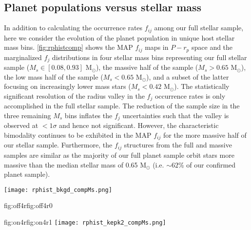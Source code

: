 \documentclass[twocolumn]{emulateapj}
\newcommand{\kepler}[1]{\emph{Kepler}#1}
\newcommand{\ktwo}[1]{\emph{K2}#1}
\newcommand{\cdbox}[1]{%
  \colorlet{currentcolor}{.}%
  {\color{Blue1}%
    \dbox{\color{currentcolor}#1}}%
}
\newcommand{\ToggleLayer}[2]{%
  \leavevmode
  \pdfstartlink user {
    /Subtype /Link
    /Border [0 0 0]%
    /A <<
      /S/JavaScript
      /JS (
         var aOCGs = this.getOCGs(), Layer;
         var Layers = "#1".split(","), Active = -1, i, l;
         for (l=0; l<Layers.length; l++) {
           Layer = Layers[l];
           for (i=0; aOCGs && i<aOCGs.length; i++) {
             if (aOCGs[i].state && aOCGs[i].name == Layer) {
               Active = l;
               aOCGs[i].state = false;
             }
           }
           if (Active >= 0) break;
         }
         if (Active == -1) {
           for (l=0; l<Layers.length; l++) {
             if (Layers[l] == "") Active = l;
           }
         }
         Active = Active + 1;
         if (Active == Layers.length) Active = 0;
         Layer = Layers[Active];
         for (i=0; aOCGs && i<aOCGs.length; i++) {
           if (aOCGs[i].name == Layer) aOCGs[i].state = true;
         }
      )
    >>
  }#2%
  \pdfendlink
}
\begin{document}
\subsection{Planet populations versus stellar mass} \label{sect:Msbin}
In addition to calculating the occurrence rates $f_{ij}$ among our full stellar sample, here we consider
the evolution of the planet population in unique host stellar mass bins. \autoref{fig:rphistcomp} shows
the MAP $f_{ij}$ maps in $P-r_p$ space and the marginalized $f_j$ distributions in four stellar mass bins
representing our full stellar sample
($M_s \in [0.08,0.93]$ M$_{\odot}$), the massive half of the sample ($M_s>0.65$ M$_{\odot}$),  
the low mass half of the sample ($M_s<0.65$ M$_{\odot}$), and a subset of the latter focusing on
increasingly lower mass stars ($M_s<0.42$ M$_{\odot}$). The statistically significant resolution of the
radius valley in the $f_j$ occurrence rates is only accomplished in the full stellar sample. The reduction
of the sample size in the three remaining $M_s$ bins inflates the $f_j$ uncertainties such that the valley
is observed at $<1\sigma$ and hence not significant. However, the characteristic bimodality continues to be
exhibited in the
MAP $f_{ij}$ for the more massive half of our stellar sample. Furthermore, the $f_{ij}$ structures from
the full and massive samples are similar
as the majority of our full planet sample orbit stars more massive than the median stellar mass of 0.65
M$_{\odot}$ (i.e. $\sim 62$\% of our confirmed planet sample).

\begin{figure*}
  \centering
  \texttt{[image: rphist\_bkgd\_compMs.png]}%
  \hspace{-.98\hsize}%
  \begin{ocg}{fig:off4r}{fig:off4r}{0}%
  \end{ocg}%
  \begin{ocg}{fig:on4r}{fig:on4r}{1}%
  \texttt{[image: rphist\_kepk2\_compMs.png]}%
  \end{ocg}
  \hspace{-.98\hsize}%
  \caption{(\emph{Interactive figure}) 2D and 1D planet occurrence rates in various stellar mass bins. \emph{Top panels}: planet occurrence
    rate maps as a function of orbital period and planet radius. Overplotted are the relevant subsets of the
    population of confirmed planets from \kepler{} and
    \ktwo{} \ToggleLayer{fig:on4r,fig:off4r}{\protect\cdbox{(\emph{small circles and diamonds})}}.
    \emph{Bottom panels}: distributions of the relative
    planet occurrence rate as a function of planet radius. Note the differing occurrence rate scales.
    Each column corresponds to a unique cut in stellar masses
    which represent the full stellar sample ($M_s \in [0.08,0.93]$ M$_{\odot}$), the massive half of the stellar sample
    ($M_s \in [0.65,0.93]$ M$_{\odot}$), the low mass half of the stellar sample ($M_s \in [0.08,0.65]$ M$_{\odot}$),
    and the lowest mass bin ($M_s \in [0.08,0.42]$ M$_{\odot}$) depicting a subset of the low mass half of the stellar
    sample. Rocky planets appear to increase in prominence around lower mass stars.}
  \label{fig:rphistcomp}
\end{figure*}
\end{document}
